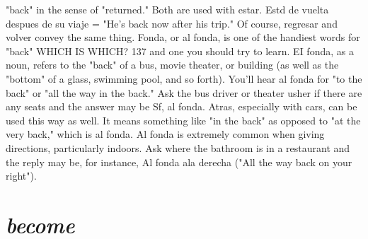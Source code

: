 \documentclass[14pt,a4paper,oneside]{memoir}
\begin{document}
"back" in the sense of "returned." Both are used with estar. Estd de
vuelta despues de su viaje = "He's back now after his trip." Of course,
regresar and volver convey the same thing.
Fonda, or al fonda, is one of the handiest words for "back"
WHICH IS WHICH? 137
and one you should try to learn. EI fonda, as a noun, refers to the
"back" of a bus, movie theater, or building (as well as the "bottom"
of a glass, swimming pool, and so forth). You'll hear al fonda for "to
the back" or "all the way in the back." Ask the bus driver or theater
usher if there are any seats and the answer may be Sf, al fonda. Atras,
especially with cars, can be used this way as well. It means something
like "in the back" as opposed to "at the very back," which is al fonda.
Al fonda is extremely common when giving directions, particularly
indoors. Ask where the bathroom is in a restaurant and the reply may
be, for instance, Al fonda ala derecha ("All the way back on your
right").

\section{\emph{become}}
\end{document}
